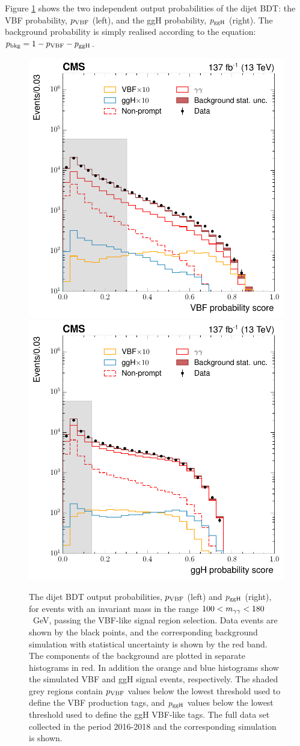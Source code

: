 Figure \ref{fig:dijetbdt_outputs} shows the two independent output probabilities of the dijet BDT: the VBF probability, $p_{\rm{VBF}}$ (left), and the ggH probability, $p_{\rm{ggH}}$ (right). The background probability is simply realised according to the equation: $p_{\rm{bkg}}=1-p_{\rm{VBF}}-p_{\rm{ggH}}$. 

\begin{figure}
  \centering
  \includegraphics[width=.4\textwidth]{Figures/hgg_overview/DijetBDT_DD_vbfMvaResult_prob_VBF_logPlot.pdf}
  \includegraphics[width=.4\textwidth]{Figures/hgg_overview/DijetBDT_ggHprob.pdf}
  \caption[Dijet BDT output probabilities: $p_{\rm{VBF}}$ and $p_{\rm{ggH}}$]
  {
    The dijet BDT output probabilities, $p_{\rm{VBF}}$ (left) and $p_{\rm{ggH}}$ (right), for events with an invariant mass in the range $100<m_{\gamma\gamma}<180$~GeV, passing the VBF-like signal region selection. Data events are shown by the black points, and the corresponding background simulation with statistical uncertainty is shown by the red band. The components of the background are plotted in separate histograms in red. In addition the orange and blue histograms show the simulated VBF and ggH signal events, respectively. The shaded grey regions contain $p_{\rm{VBF}}$ values below the lowest threshold used to define the VBF production tags, and $p_{\rm{ggH}}$ values below the lowest threshold used to define the ggH VBF-like tags. The full data set collected in the period 2016-2018 and the corresponding simulation is shown.
  }
  \label{fig:dijetbdt_outputs}
\end{figure}

